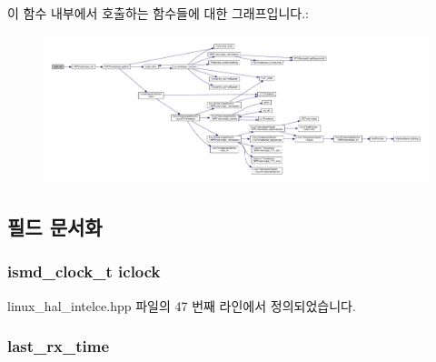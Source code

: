 이 함수 내부에서 호출하는 함수들에 대한 그래프입니다.\+:
\nopagebreak
\begin{figure}[H]
\begin{center}
\leavevmode
\includegraphics[width=350pt]{class_linux_timestamper_intel_c_e_aeada5965d363813719d4b3e0c6ba209e_cgraph}
\end{center}
\end{figure}




\subsection{필드 문서화}
\subsubsection[{\texorpdfstring{iclock}{iclock}}]{\setlength{\rightskip}{0pt plus 5cm}ismd\+\_\+clock\+\_\+t iclock\hspace{0.3cm}{\ttfamily [private]}}\hypertarget{class_linux_timestamper_intel_c_e_a5a43b6dbee61e4ed5c9bae96f5d24830}{}\label{class_linux_timestamper_intel_c_e_a5a43b6dbee61e4ed5c9bae96f5d24830}


linux\+\_\+hal\+\_\+intelce.\+hpp 파일의 47 번째 라인에서 정의되었습니다.

\subsubsection[{\texorpdfstring{last\+\_\+rx\+\_\+time}{last_rx_time}}]{ last\+\_\+rx\+\_\+time\hspace{0.3cm}{\ttfamily [private]}}\hypertarget{class_linux_timestamper_intel_c_e_af1dded3f45070e35eba64d2474864dfb}{}\label{class_linux_timestamper_intel_c_e_af1dded3f45070e35eba64d2474864dfb}


